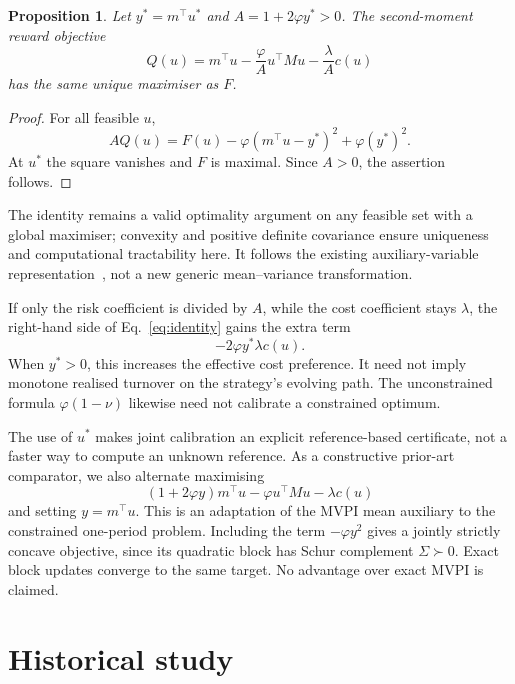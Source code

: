 \documentclass[sigconf,anonymous,review,pbalance]{acmart}
\newtheorem{proposition}{Proposition}
\begin{document}
\begin{proposition}\label{prop:joint}
Let $y^*=m^\top u^*$ and $A=1+2\varphi y^*>0$. The second-moment reward objective
\begin{equation}
 Q(u)=m^\top u-\frac{\varphi}{A}u^\top M u-\frac{\lambda}{A}c(u)
\end{equation}
has the same unique maximiser as $F$.
\end{proposition}
\begin{proof}
For all feasible $u$,
\begin{equation}\label{eq:identity}
 AQ(u)=F(u)-\varphi(m^\top u-y^*)^2+\varphi(y^*)^2.
\end{equation}
At $u^*$ the square vanishes and $F$ is maximal. Since $A>0$, the assertion follows.
\end{proof}
The identity remains a valid optimality argument on any feasible set with a global maximiser; convexity and positive definite covariance ensure uniqueness and computational tractability here. It follows the existing auxiliary-variable representation\ \cite{zhang2021}, not a new generic mean--variance transformation.

If only the risk coefficient is divided by $A$, while the cost coefficient stays $\lambda$, the right-hand side of Eq.\ \eqref{eq:identity} gains the extra term
\begin{equation}\label{eq:costdistortion}
 -2\varphi y^*\lambda c(u).
\end{equation}
When $y^*>0$, this increases the effective cost preference. It need not imply monotone realised turnover on the strategy's evolving path. The unconstrained formula $\varphi(1-\nu)$ likewise need not calibrate a constrained optimum.

The use of $u^*$ makes joint calibration an explicit reference-based certificate, not a faster way to compute an unknown reference. As a constructive prior-art comparator, we also alternate maximising
\begin{equation}
 (1+2\varphi y)m^\top u-\varphi u^\top Mu-\lambda c(u)
\end{equation}
and setting $y=m^\top u$. This is an adaptation of the MVPI mean auxiliary to the constrained one-period problem. Including the term $-\varphi y^2$ gives a jointly strictly concave objective, since its quadratic block has Schur complement $\Sigma\succ0$. Exact block updates converge to the same target. No advantage over exact MVPI is claimed.

\section{Historical study}
\end{document}
